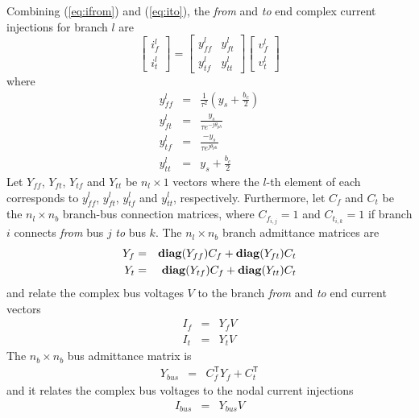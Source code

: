 Combining (\ref{eq:ifrom}) and (\ref{eq:ito}), the \textit{from} and
\textit{to} end complex current injections for branch $l$ are
\begin{equation}
\label{eq:ybranch}
\begin{bmatrix}
i_f^l\\
i_t^l
\end{bmatrix}
=
\begin{bmatrix}
y_{ff}^l& y_{ft}^l\\
y_{tf}^l& y_{tt}^l
\end{bmatrix}
\begin{bmatrix}
v_f^l\\
v_t^l
\end{bmatrix}
\end{equation}
where
\begin{eqnarray}
\label{eq:yff}
y_{ff}^l& =& \frac{1}{\tau^2} \left(y_s + \frac{b_c}{2}\right)\\
\label{eq:yft}
y_{ft}^l& =& \frac{y_s}{\tau e^{-j\theta_{ph}}}\\
\label{eq:ytf}
y_{tf}^l& =& \frac{-y_s}{\tau e^{j\theta_{ph}}}\\
\label{eq:ytt}
y_{tt}^l& =& y_s + \frac{b_c}{2}
\end{eqnarray}
Let $Y_{ff}$, $Y_{ft}$, $Y_{tf}$ and $Y_{tt}$ be $n_l \times 1$ vectors where
the $l$-th element of each corresponds to $y_{ff}^l$, $y_{ft}^l$, $y_{tf}^l$
and $y_{tt}^l$, respectively.  Furthermore, let $C_f$ and $C_t$ be the
$n_l \times n_b$ branch-bus connection matrices, where $C_{f_{i,j}} = 1$ and
$C_{t_{i,k}} = 1$ if branch $i$ connects \textit{from} bus $j$ \textit{to} bus
$k$.  The $n_l \times n_b$ branch admittance matrices are
\begin{eqnarray}
Y_f& =& \mathop{\mathbf{diag}}(Y_{ff})C_f + \mathop{\mathbf{diag}}(Y_{ft})C_t\\
Y_t& =& \mathop{\mathbf{diag}}(Y_{tf})C_f + \mathop{\mathbf{diag}}(Y_{tt})C_t
\end{eqnarray}
and relate the complex bus voltages $V$ to the branch \textit{from} and
\textit{to} end current vectors
\begin{eqnarray}
I_{f}& =& Y_{f}V\\
I_{t}& =& Y_{t}V
\end{eqnarray}
The $n_b \times n_b$ bus admittance matrix is
\begin{eqnarray}
Y_{bus}& =& C_f^\mathsf{T} Y_f + C_t^\mathsf{T}
\end{eqnarray}
and it relates the complex bus voltages to the nodal current injections
\begin{eqnarray}
I_{bus}& =& Y_{bus}V
\end{eqnarray}
